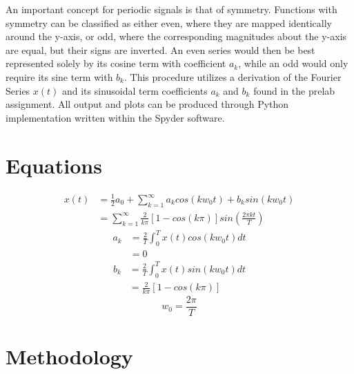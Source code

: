 \documentclass[12pt]{report}
\begin{document}
An important concept for periodic signals is that of symmetry. Functions with symmetry can be classified as either even, where they are mapped identically around the y-axis, or odd, where the corresponding magnitudes about the y-axis are equal, but their signs are inverted. An even series would then be best represented solely by its cosine term with coefficient $ a_k $, while an odd would only require its sine term with $ b_k $. This procedure utilizes a derivation of the Fourier Series $ x(t) $ and its sinusoidal term coefficients $ a_k $ and $ b_k $ found in the prelab assignment. All output and plots can be produced through Python implementation written within the Spyder software. \\

\section{Equations}

\begin{align}
	x(t) &= \frac{1}{2}a_0 + \sum_{k=1}^{\infty}a_kcos(kw_0t) + b_ksin(kw_0t) \\
	&= \sum_{k=1}^{\infty}\frac{2}{k\pi}[1 - cos(k\pi)]sin(\frac{2\pi kt}{T}) \nonumber
\end{align}
\begin{align}
	a_k &= \frac{2}{T}\int_{0}^{T}x(t)cos(kw_0t)dt \\
	&= 0 \nonumber
\end{align}
\begin{align}
	b_k &= \frac{2}{T}\int_{0}^{T}x(t)sin(kw_0t)dt \\
	&= \frac{2}{k\pi}[1 - cos(k\pi)]
\end{align}
\begin{equation}
	w_0 = \frac{2\pi}{T}
\end{equation}

\section{Methodology}
\end{document}
